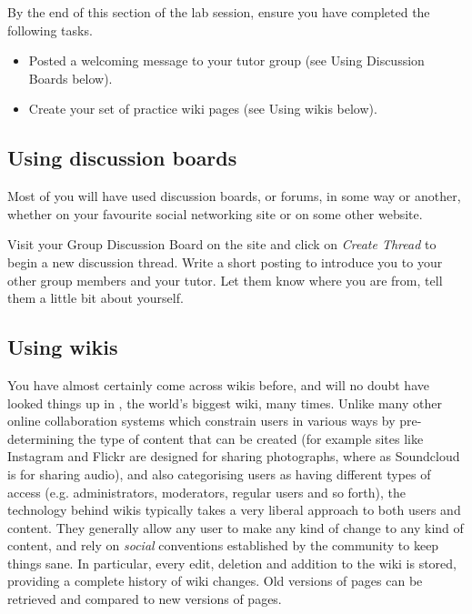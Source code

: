 \begin{firstonly}
By the end of this section of the lab session, ensure you have completed the following tasks.

\begin{itemize}

\item Posted a welcoming message to your tutor group (see Using
Discussion Boards below).

\item Create your set of practice wiki pages (see Using wikis below).

\end{itemize}

\subsection{Using discussion boards}
\label{sec:using-forums}

Most of you will have used discussion boards, or forums, in some way
or another, whether on your favourite social networking site or on
some other website.

Visit your Group Discussion Board on the  site
and click on \emph{Create Thread} to begin a new discussion
thread. Write a short posting to introduce you to your other group
members and your tutor. Let them know where you are from, tell them a
little bit about yourself.

\subsection{Using wikis}
\label{sec:using-wikis}

You have almost certainly come across wikis before, and will no doubt
have looked things up in , the world's
biggest wiki, many times. Unlike many other online collaboration
systems which constrain users in various ways by pre-determining the
type of content that can be created (for example sites like Instagram
and Flickr are designed for sharing photographs, where as Soundcloud
is for sharing audio), and also categorising users as having different
types of access (e.g. administrators, moderators, regular users and so
forth), the technology behind wikis typically takes a very liberal
approach to both users and content. They generally allow any user to
make any kind of change to any kind of content, and rely on
\textit{social} conventions established by the community to keep
things sane. In particular, every edit, deletion and addition to the
wiki is stored, providing a complete history of wiki changes. Old
versions of pages can be retrieved and compared to new versions of
pages.


\end{firstonly}

